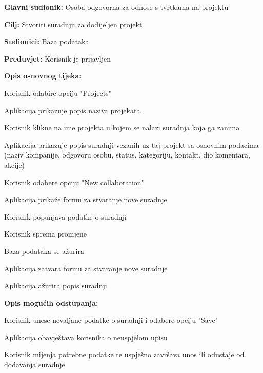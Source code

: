 					\noindent {}
					\begin{packed_item}

						\item \textbf{Glavni sudionik:} Osoba odgovorna za odnose s tvrtkama na projektu
						\item \textbf{Cilj:} Stvoriti suradnju za dodijeljen projekt
						\item \textbf{Sudionici:} Baza podataka
						\item \textbf{Preduvjet:} Korisnik je prijavljen
						\item \textbf{Opis osnovnog tijeka:}

						\item[] \begin{packed_enum}

							\item Korisnik odabire opciju "Projects"
							\item Aplikacija prikazuje popis naziva projekata
							\item Korisnik klikne na ime projekta u kojem se nalazi suradnja koja ga zanima
							\item Aplikacija prikazuje popis suradnji vezanih uz taj projekt sa osnovnim podacima (naziv kompanije, odgovoru osobu, status, kategoriju, kontakt, dio komentara, akcije)
							\item Korisnik odabere opciju "New collaboration"
							\item Aplikacija prikaže formu za stvaranje nove suradnje
							\item Korisnik popunjava podatke o suradnji
							\item Korisnik sprema promjene
							\item Baza podataka se ažurira
							\item Aplikacija zatvara formu za stvaranje nove suradnje
							\item Aplikacija ažurira popis suradnji
						\end{packed_enum}

						\item \textbf{Opis mogućih odstupanja:}

						\item[] \begin{packed_item}

							\item[8.c] Korisnik unese nevaljane podatke o suradnji i odabere opciju "Save"
							\item[] \begin{packed_enum}

								\item Aplikacija obavještava korisnika o neuspjelom upisu
								\item Korisnik mijenja potrebne podatke te uspješno završava unos ili
								odustaje od dodavanja suradnje

							\end{packed_enum}

						\end{packed_item}
					\end{packed_item}

